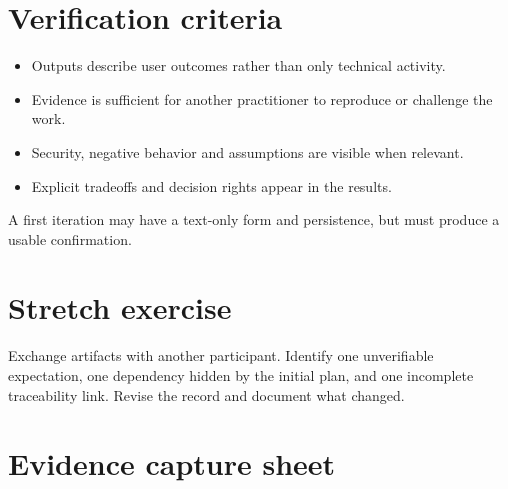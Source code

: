 \documentclass[11pt,letterpaper]{article}
\begin{document}
\section{Verification criteria}
\begin{itemize}[leftmargin=*,itemsep=2pt]
\item Outputs describe user outcomes rather than only technical activity.
\item Evidence is sufficient for another practitioner to reproduce or challenge the work.
\item Security, negative behavior and assumptions are visible when relevant.
\item Explicit tradeoffs and decision rights appear in the results.
\end{itemize}
\begin{tcolorbox}[colback=amberback,colframe=navy,title={Instructor note / expected reasoning},breakable]
A first iteration may have a text-only form and persistence, but must produce a usable confirmation.

\end{tcolorbox}
\section{Stretch exercise}
Exchange artifacts with another participant. Identify one unverifiable expectation, one dependency hidden by the initial plan, and one incomplete traceability link. Revise the record and document what changed.

\section{Evidence capture sheet}
\end{document}
